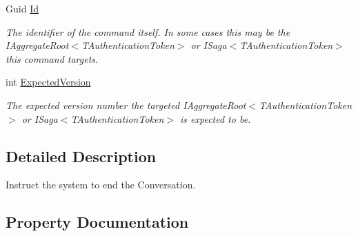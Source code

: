 \begin{DoxyCompactItemize}
Guid \hyperlink{classCqrs_1_1Akka_1_1Tests_1_1Unit_1_1Commands_1_1EndConversationCommand_a55773d68291b3c0476ac8667bbada4d6_a55773d68291b3c0476ac8667bbada4d6}{Id}
\begin{DoxyCompactList}\small\item\em The identifier of the command itself. In some cases this may be the I\+Aggregate\+Root$<$\+T\+Authentication\+Token$>$ or I\+Saga$<$\+T\+Authentication\+Token$>$ this command targets. \end{DoxyCompactList}\item 
int \hyperlink{classCqrs_1_1Akka_1_1Tests_1_1Unit_1_1Commands_1_1EndConversationCommand_a8da7afeb73c29e5d6387d820ae734240_a8da7afeb73c29e5d6387d820ae734240}{Expected\+Version}
\begin{DoxyCompactList}\small\item\em The expected version number the targeted I\+Aggregate\+Root$<$\+T\+Authentication\+Token$>$ or I\+Saga$<$\+T\+Authentication\+Token$>$ is expected to be. \end{DoxyCompactList}\end{DoxyCompactItemize}


\subsection{Detailed Description}
Instruct the system to end the Conversation. 



\subsection{Property Documentation}
\mbox{\label{classCqrs_1_1Akka_1_1Tests_1_1Unit_1_1Commands_1_1EndConversationCommand_abe590196615418b398d11ffd22b7310b_abe590196615418b398d11ffd22b7310b}} 
